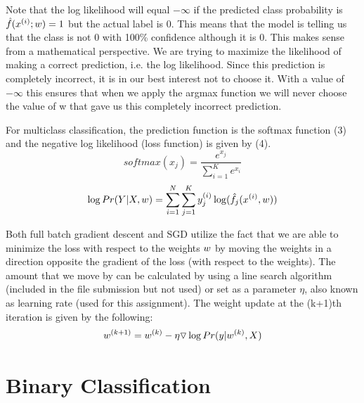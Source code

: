 \documentclass[11pt,letterpaper,titlepage]{article}
\begin{document}
	Note that the log likelihood will equal $-\infty$ if the predicted class probability is $\hat{f}(\boldmath x^{(i)}; \boldmath w) = 1$ but the actual label is 0. This means that the model is telling us that the class is not 0 with 100\% confidence although it is 0. This makes sense from a mathematical perspective. We are trying to maximize the likelihood of making a correct prediction, i.e. the log likelihood. Since this prediction is completely incorrect, it is in our best interest not to choose it. With a value of $- \infty$ this ensures that when we apply the argmax function we will never choose the value of w that gave us this completely incorrect prediction.
	
	For multiclass classification, the prediction function is the softmax function (3) and the negative log likelihood (loss function) is given by (4).
	\begin{equation}
	softmax(x_{j})=\frac{e^{x_{j}}}{\sum_{i=1}^{K}e^{x_{i}}}
	\end{equation}
	\begin{equation}
	\log Pr(\boldmath Y \unboldmath | \boldmath X \unboldmath, \boldmath w \unboldmath) = \sum_{i=1}^{N} \sum_{j=1}^{K}  y_{j}^{(i)}\log(\hat{f_{j}}(\boldmath x^{(i)} \unboldmath,\boldmath w \unboldmath))
	\end{equation}
	
	Both full batch gradient descent and SGD utilize the fact that we are able to minimize the loss with respect to the weights $\boldmath w$ by moving the weights in a direction opposite the gradient of the loss (with respect to the weights). The amount that we move by can be calculated by using a line search algorithm (included in the file submission but not used) or set as a parameter $\eta$, also known as learning rate (used for this assignment). The weight update at the (k+1)th iteration is given by the following:
	\begin{equation}
	\boldmath w^{(k+1)} \unboldmath = \boldmath w^{(k)} \unboldmath - \eta \triangledown \log Pr(\boldmath y \unboldmath | \boldmath w^{(k)} \unboldmath, \boldmath X \unboldmath)
	\end{equation}
	
	\section{Binary Classification}
\end{document}
